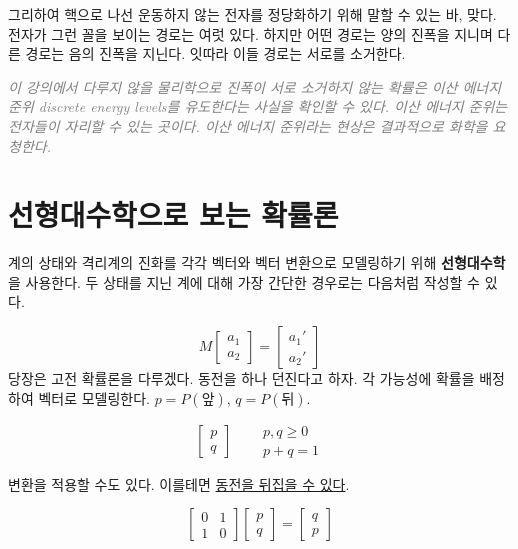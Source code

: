 \documentclass[a4paper,chapter,atbegshi,]{oblivoir}
\begin{document}
\newpage
그리하여 핵으로 나선 운동하지 않는 전자를 정당화하기 위해 말할 수 있는 바,
맞다. 전자가 그런 꼴을 보이는 경로는 여럿 있다. 하지만 어떤 경로는 양의 진폭을
지니며 다른 경로는 음의 진폭을 지닌다. 잇따라 이들 경로는 서로를 소거한다. 

\hfill

\hfill\parbox[t]{9cm}{\textcolor{gray}{\itshape 이 강의에서 다루지 않을 
물리학으로 진폭이 서로 소거하지 않는 확률은 이산 에너지 준위{\footnotesize
discrete energy levels}를 유도한다는 사실을 확인할 수 있다. 이산 에너지
준위는 전자들이 자리할 수 있는 곳이다. 이산 에너지 준위라는 현상은 결과적으로
화학을 요청한다.}}

\hfill

\section{선형대수학으로 보는 확률론}

계의 상태와 격리계의 진화를 각각 벡터와 벡터 변환으로 모델링하기 위해 
\textbf{선형대수학}을 사용한다. 두 상태를 지닌 계에 대해 가장 간단한
경우로는 다음처럼 작성할 수 있다.

\begin{equation}
M \begin{bmatrix} a_1\\a_2 \end{bmatrix} = 
\begin{bmatrix} a_1'\\ a_2' \end{bmatrix}
\end{equation}
당장은 고전 확률론을 다루겠다. 동전을 하나 던진다고 하자. 각 가능성에 
확률을 배정하여 벡터로 모델링한다. $p = P(\textrm{앞})$, $q = P(\textrm{뒤})$.

\begin{equation}
  \begin{bmatrix}p\\q\end{bmatrix}\quad
  \begin{aligned}
    &p,q \geq 0 \\
    &p+q = 1
  \end{aligned}
\end{equation}

변환을 적용할 수도 있다. 이를테면 \underline{동전을 뒤집을 수 있다}.

\begin{equation}
  \begin{bmatrix} 0 & 1 \\ 1 & 0 \end{bmatrix}
  \begin{bmatrix} p \\ q \end{bmatrix} = 
  \begin{bmatrix} q \\ p \end{bmatrix}
\end{equation}
\end{document}
